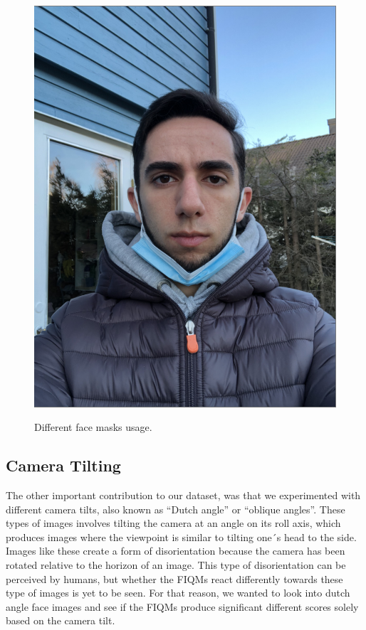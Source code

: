 \begin{figure}[h]
        {\includegraphics[scale = 0.18]{figures/1152.png}\hspace{1cm}}
    \caption{Different face masks usage.}
    \label{fig:masks}
\end{figure}
\subsection*{Camera Tilting}
The other important contribution to our dataset, was that we experimented with different camera tilts, also known as ``Dutch angle'' or ``oblique angles''. These types of images involves tilting the camera at an angle on its roll axis, which produces images where the viewpoint is similar to tilting one´s head to the side. Images like these create a form of disorientation because the camera has been rotated relative to the horizon of an image. This type of disorientation can be perceived by humans, but whether the FIQMs react differently towards these type of images is yet to be seen. For that reason, we wanted to look into dutch angle face images and see if the FIQMs produce significant different scores solely based on the camera tilt. 

